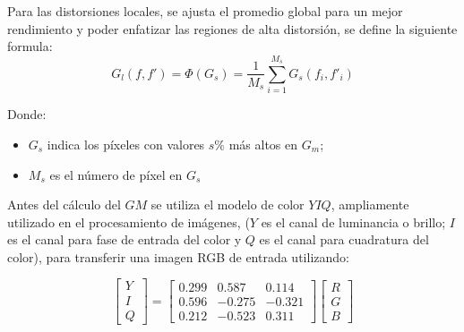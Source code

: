 

Para las distorsiones locales, se ajusta el promedio global para un mejor rendimiento y poder enfatizar las regiones de alta distorsión, se define la siguiente formula:
\begin{equation}\label{eq:gl}
G_l(f,f') = \Phi (G_s)=\frac{1}{M_s} \sum_{i=1}^{M_s} G_s(f_i,{f'}_i)
\end{equation}

Donde:
\begin{itemize}
\item $ G_{s}$ indica los píxeles con valores $s\%$ más altos en $G_{m}$;
\item $M_s$ es el número de píxel en $G_s$
\end{itemize}


Antes del cálculo del $GM$ se utiliza el modelo de color $YIQ$, ampliamente utilizado en el procesamiento de imágenes, ($Y$ es el canal de luminancia o brillo; $I$ es el canal para fase de entrada del color y $Q$ es el canal para cuadratura del color), para transferir una imagen RGB de entrada utilizando:



\begin{equation}\label{eq:yiq}
\begin{bmatrix}
Y\\ 
I\\ 
Q
\end{bmatrix} = \begin{bmatrix}
0.299 &  0.587 & 0.114\\ 
 0.596 & -0.275 & -0.321\\ 
 0.212 & -0.523 & 0.311
\end{bmatrix} \begin{bmatrix}
R\\ 
G\\ 
B
\end{bmatrix}
\end{equation}

